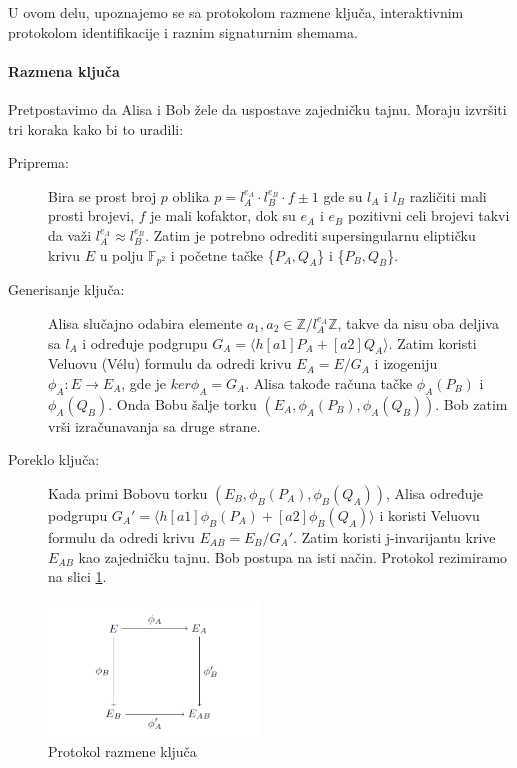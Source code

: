 \documentclass[a4paper]{article}
\begin{document}
U ovom delu, upoznajemo se sa protokolom razmene ključa, interaktivnim protokolom identifikacije i raznim signaturnim shemama. 

\paragraph{Razmena ključa} Pretpostavimo da Alisa i Bob žele da uspostave zajedničku tajnu. Moraju izvršiti tri koraka kako bi to uradili:

\begin{description}
	\item[Priprema:] Bira se prost broj $p$ oblika $p = l^{e_A}_{A} \cdot l^{e_B}_{B} \cdot f \pm 1$ gde su $l_{A}$ i  $l_{B}$ različiti mali prosti brojevi, $f$ je mali kofaktor, dok su $e_A$ i $e_B$ pozitivni celi brojevi takvi da važi $l^{e_A}_{A} \approx l^{e_B}_{B}$. Zatim je potrebno odrediti supersingularnu eliptičku krivu $E$ u polju $\mathbb{F}_{p^2}$ i početne tačke \{$P_A, Q_A$\} i \{$P_B, Q_B$\}. 
	
	
	\item[Generisanje ključa:] Alisa slučajno odabira elemente $a_1, a_2 \in \mathbb{Z}/l^{e_A}_{A}\mathbb{Z}$, takve da nisu oba deljiva sa $l_A$ i određuje podgrupu $G_A = \langle h[a1]P_A + [a2]Q_A \rangle $. Zatim koristi Veluovu (V\' elu) formulu da odredi krivu $E_A = E/G_A$ i izogeniju $\phi_A: E \longrightarrow E_A$, gde je $ker \phi_A = G_A$. Alisa takođe računa tačke $\phi_A(P_B)$ i $\phi_A(Q_B)$. Onda Bobu šalje torku $(E_A, \phi_A(P_B), \phi_A(Q_B))$. Bob  zatim vrši izračunavanja sa druge strane.
	
	\item[Poreklo ključa:] Kada primi Bobovu torku $(E_B, \phi_B(P_A), \phi_B(Q_A))$, Alisa određuje podgrupu $G_A' = \langle h[a1]\phi_B(P_A) + [a2]\phi_B(Q_A) \rangle$ i koristi Veluovu formulu da odredi krivu $E_{AB} = E_B / G_A'$. Zatim koristi j-invarijantu krive $E_{AB}$ kao zajedničku tajnu. Bob postupa na isti način. Protokol rezimiramo na slici \ref{fig: razmena kljuca}.
	
\end{description}


\begin{figure}[h]
	\centering
	\includegraphics[width=0.5\textwidth]{razmena_kljuca.png}
	\caption{Protokol razmene ključa}
	\label{fig: razmena kljuca}
\end{figure}
\end{document}
